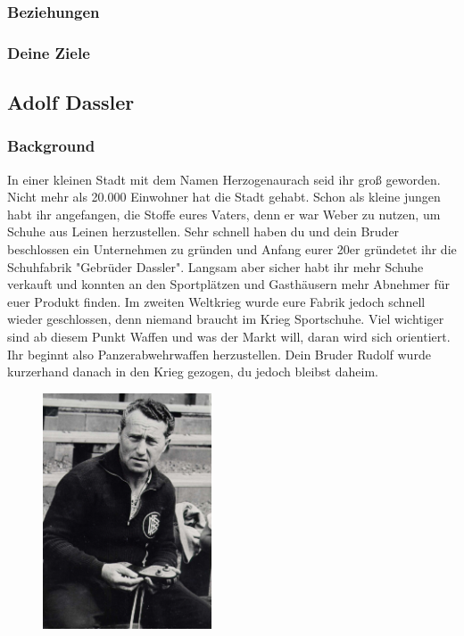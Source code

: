 \documentclass[12pt, a4paper, openany]{report}
\begin{document}
\subsubsection{Beziehungen}

\subsubsection{Deine Ziele}

\subsection{Adolf Dassler}
\subsubsection{Background}
In einer kleinen Stadt mit dem Namen Herzogenaurach seid ihr groß geworden. Nicht mehr als 20.000 Einwohner hat die Stadt gehabt. Schon als kleine jungen habt ihr angefangen, die Stoffe eures Vaters, denn er war Weber zu nutzen, um Schuhe aus Leinen herzustellen. Sehr schnell haben du und dein Bruder beschlossen ein Unternehmen zu gründen und Anfang eurer 20er gründetet ihr die Schuhfabrik "Gebrüder Dassler". Langsam aber sicher habt ihr mehr Schuhe verkauft und konnten an den Sportplätzen und Gasthäusern mehr Abnehmer für euer Produkt finden. Im zweiten Weltkrieg wurde eure Fabrik jedoch schnell wieder geschlossen, denn niemand braucht im Krieg Sportschuhe. Viel wichtiger sind ab diesem Punkt Waffen und was der Markt will, daran wird sich orientiert. Ihr beginnt also Panzerabwehrwaffen herzustellen. Dein Bruder Rudolf wurde kurzerhand danach in den Krieg gezogen, du jedoch bleibst daheim. 

\begin{figure}[h!]
\centering
\includegraphics[width=5cm]{Adolf Dassler.jpg}
\end{figure}
\end{document}
